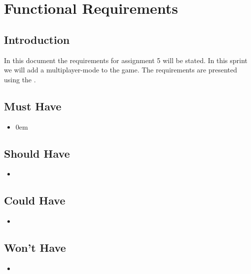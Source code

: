 \chapter{Functional Requirements}

\section{Introduction}
In this document the requirements for assignment 5 will be stated. In this sprint we will add a multiplayer-mode to the game. \noindent The requirements are presented using the .

\section{Must Have}
\begin{itemize}
\item
\itemsep0em

\end{itemize}

\section{Should Have}
\begin{itemize}
\itemsep0em
\item
\end{itemize}

\section{Could Have}
\begin{itemize}
\itemsep0em
\item
\end{itemize}

\section{Won't Have}
\begin{itemize}
\itemsep0em
\item
\end{itemize}